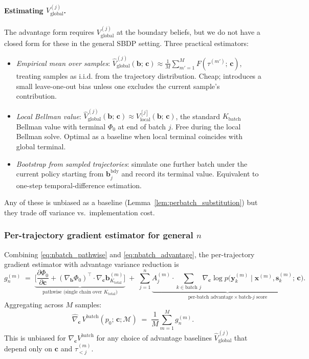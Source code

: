 \documentclass[11pt,a4paper]{article}
\newcommand{\bc}{\bm{c}}
\newcommand{\bx}{\bm{x}}
\newcommand{\by}{\bm{y}}
\newcommand{\bs}{\bm{s}}
\newcommand{\bb}{\bm{b}}
\begin{document}
\paragraph{Estimating $V_{\mathrm{global}}^{(j)}$.}  The advantage form requires
$V_{\mathrm{global}}^{(j)}$ at the boundary beliefs, but we do not have a closed form for
these in the general SBDP setting.  Three practical estimators:
\begin{itemize}[nosep, leftmargin=2em]
\item \emph{Empirical mean over samples}: $\widehat{V}_{\mathrm{global}}^{(j)}(\bb;\, \bc) \approx
  \frac{1}{M} \sum_{m'=1}^{M} F(\tau^{(m')};\, \bc)$, treating samples as i.i.d. from the trajectory
  distribution.  Cheap; introduces a small leave-one-out bias unless one excludes the current
  sample's contribution.
\item \emph{Local Bellman value}: $\widehat{V}_{\mathrm{global}}^{(j)}(\bb;\, \bc) \approx
  V^{[j]}_\mathrm{local}(\bb;\, \bc)$, the standard $K_\mathrm{batch}$ Bellman value with terminal
  $\Phi_0$ at end of batch $j$.  Free during the local Bellman solve.  Optimal as a baseline
  when local terminal coincides with global terminal.
\item \emph{Bootstrap from sampled trajectories}: simulate one further batch under the current
  policy starting from $\bb^{\mathrm{bdy}}_j$ and record its terminal value.  Equivalent to
  one-step temporal-difference estimation.
\end{itemize}
Any of these is unbiased as a baseline (Lemma~\ref{lem:perbatch_substitution}) but they trade
off variance vs.\ implementation cost.

\subsubsection{Per-trajectory gradient estimator for general \texorpdfstring{$n$}{n}}
\label{sec:nbatch_estimator}

Combining \eqref{eq:nbatch_pathwise} and \eqref{eq:nbatch_advantage}, the per-trajectory
gradient estimator with advantage variance reduction is
\begin{equation}
g^{(m)}_n
\;=\;
\underbrace{\biggl[\frac{\partial \Phi_0}{\partial \bc} + (\nabla_{\bb} \Phi_0)^\top \cdot \nabla_{\bc} \bb_{K_\mathrm{total}}^{(m)}\biggr]}_{\text{pathwise (single chain over } K_\mathrm{total}\text{)}}
\;+\;
\sum_{j=1}^{n} \underbrace{A_j^{(m)} \cdot \sum_{k \in \text{batch } j} \nabla_{\bc} \log p\bigl(\by_k^{(m)} \mid \bx^{(m)}, \bs_k^{(m)};\, \bc\bigr)}_{\text{per-batch advantage} \times \text{batch-} j \text{ score}}.
\label{eq:gm_nbatch_full}
\end{equation}
Aggregating across $M$ samples:
\begin{equation}
\widehat{\nabla}_{\bc}\, V^\mathrm{batch}(p_0;\, \bc; \mathcal{M})
\;=\;
\frac{1}{M} \sum_{m=1}^{M} g^{(m)}_n.
\end{equation}
This is unbiased for $\nabla_{\bc} V^\mathrm{batch}$ for any choice of advantage baselines
$\widehat{V}_{\mathrm{global}}^{(j)}$ that depend only on $\bc$ and $\tau_{<j}^{(m)}$.
\end{document}
